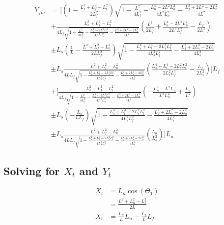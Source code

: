 \documentclass[11pt, landscape]{article}
\begin{document}
\begin{align}
  \dot{Y}_{fm} &= \bigg[\left(1 - \frac{L_{s}^2+L_f^2-L_{t}^2}{2L_f^2}\right)\sqrt{1 - \frac{L^2}{4L_f^2} - \frac{L_n^4 - 2L^2L_n^2}{4L^2L^2_{n}} - \frac{L_f^2 + 2L^2 - 2L_n^2}{4L^2}}\\
    &+ \frac{L_{s}^2+L_f^2-L_{t}^2}{4L_f\sqrt{1 - \frac{L^2}{4L_f^2} - \frac{L_n^4 - 2L^2L_n^2}{4L^2L^2_{n}} - \frac{L_f^2 + 2L^2 - 2L_n^2}{4L^2}}}\left(\frac{L^2}{2L_f^3} + \frac{L_n^4 - 2L^2L_n^2}{2L^2L_f^3} - \frac{L_f}{2L^2}\right)\\
    &\pm L_s\left(\frac{1}{L} - \frac{L^2+L_f^2-L_n^2}{2LL_f^2}\right)\sqrt{1 - \frac{L_s^4 + L_t^4 - 2L_s^2L_t^2}{4L_s^2L_f^2} - \frac{L_f^2 + 2L_s^2 - 2L_n^2}{4L_s^2}}\\
    &\pm L_s\frac{L^2+L_f^2-L_n^2}{4LL_f\sqrt{1 - \frac{L_s^4 + L_t^4 - 2L_s^2L_t^2}{4L_s^2L_f^2} - \frac{L_f^2 + 2L_s^2 - 2L_n^2}{4L_s^2}}}\left(\frac{L_s^4 + L_t^4 - 2L_s^2L_t^2}{2L_s^2L_f^3} - \frac{L_f}{2L_s^2}\right)
  \bigg]\dot{L}_f\\
  &+\bigg[\frac{L_{s}^2+L_f^2-L_{t}^2}{4L_f\sqrt{1 - \frac{L^2}{4L_f^2} - \frac{L_n^4 - 2L^2L_n^2}{4L^2L^2_{n}} - \frac{L_f^2 + 2L^2 - 2L_n^2}{4L^2}}}\left(-\frac{L_n^3 - L^2L_n}{L^2L^2_{n}} + \frac{L_n}{L^2}\right)\\
    &\pm L_s\left(-\frac{L_n}{LL_f}\right)\sqrt{1 - \frac{L_s^4 + L_t^4 - 2L_s^2L_t^2}{4L_s^2L_f^2} - \frac{L_f^2 + 2L_s^2 - 2L_n^2}{4L_s^2}}\\
    &\pm L_s\frac{L^2+L_f^2-L_n^2}{4LL_f\sqrt{1 - \frac{L_s^4 + L_t^4 - 2L_s^2L_t^2}{4L_s^2L_f^2} - \frac{L_f^2 + 2L_s^2 - 2L_n^2}{4L_s^2}}}\left(\frac{L_n}{L_s^2}\right)
  \bigg]\dot{L}_n
\end{align}

\subsection{Solving for $X_t$ and $Y_t$}

\begin{align}
  X_{t} &= L_n\cos(\Theta_{1}) \\
  &= \frac{L^2+L_n^2-L_f^2}{2L} \\
  \dot{X}_t &= \frac{L_n}{L}\dot{L}_n - \frac{L_f}{L}\dot{L}_f\\
\end{align}
\end{document}
